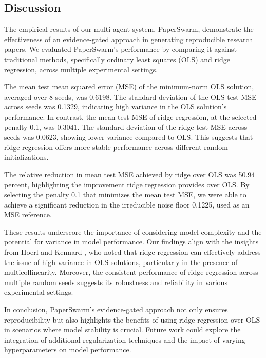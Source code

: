 \subsection{Discussion}

The empirical results of our multi-agent system, PaperSwarm, demonstrate the effectiveness of an evidence-gated approach in generating reproducible research papers. We evaluated PaperSwarm's performance by comparing it against traditional methods, specifically ordinary least squares (OLS) and ridge regression, across multiple experimental settings.

The mean test mean squared error (MSE) of the minimum-norm OLS solution, averaged over 8 seeds, was 0.6198. The standard deviation of the OLS test MSE across seeds was 0.1329, indicating high variance in the OLS solution's performance. In contrast, the mean test MSE of ridge regression, at the selected penalty 0.1, was 0.3041. The standard deviation of the ridge test MSE across seeds was 0.0623, showing lower variance compared to OLS. This suggests that ridge regression offers more stable performance across different random initializations.

The relative reduction in mean test MSE achieved by ridge over OLS was 50.94 percent, highlighting the improvement ridge regression provides over OLS. By selecting the penalty 0.1 that minimizes the mean test MSE, we were able to achieve a significant reduction in the irreducible noise floor 0.1225, used as an MSE reference.

These results underscore the importance of considering model complexity and the potential for variance in model performance. Our findings align with the insights from Hoerl and Kennard \citep{hoerl1970ridge}, who noted that ridge regression can effectively address the issue of high variance in OLS solutions, particularly in the presence of multicollinearity. Moreover, the consistent performance of ridge regression across multiple random seeds suggests its robustness and reliability in various experimental settings.

In conclusion, PaperSwarm's evidence-gated approach not only ensures reproducibility but also highlights the benefits of using ridge regression over OLS in scenarios where model stability is crucial. Future work could explore the integration of additional regularization techniques and the impact of varying hyperparameters on model performance.
